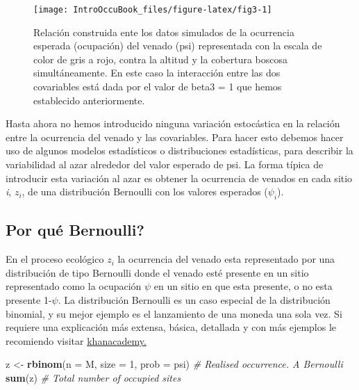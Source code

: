 \documentclass[
]{book}
\newenvironment{Shaded}{\begin{snugshade}}{\end{snugshade}}
\newcommand{\CommentTok}[1]{\textcolor[rgb]{0.56,0.35,0.01}{\textit{#1}}}
\newcommand{\DataTypeTok}[1]{\textcolor[rgb]{0.13,0.29,0.53}{#1}}
\newcommand{\DecValTok}[1]{\textcolor[rgb]{0.00,0.00,0.81}{#1}}
\newcommand{\KeywordTok}[1]{\textcolor[rgb]{0.13,0.29,0.53}{\textbf{#1}}}
\newcommand{\NormalTok}[1]{#1}
\newcommand{\StringTok}[1]{\textcolor[rgb]{0.31,0.60,0.02}{#1}}
\begin{document}
\begin{figure}
\texttt{[image: IntroOccuBook\_files/figure-latex/fig3-1]} \caption[fig3]{Relación construida ente los datos simulados de la ocurrencia esperada (ocupación) del venado (psi) representada con la escala de color de gris a rojo, contra la altitud y la cobertura boscosa simultáneamente. En este caso la interacción entre las dos covariables está dada por el valor de beta3 = 1 que hemos establecido anteriormente.}\label{fig:fig3}
\end{figure}

Hasta ahora no hemos introducido ninguna variación estocástica en la relación entre la ocurrencia del venado y las covariables. Para hacer esto debemos hacer uso de algunos modelos estadísticos o distribuciones estadísticas, para describir la variabilidad al azar alrededor del valor esperado de psi. La forma típica de introducir esta variación al azar es obtener la ocurrencia de venados en cada sitio \emph{i}, \(z _{i}\), de una distribución Bernoulli con los valores esperados (\(\psi _{i}\)).

\hypertarget{por-quuxe9-bernoulli}{%
\subsection{Por qué Bernoulli?}\label{por-quuxe9-bernoulli}}

En el proceso ecológico \(z _{i}\) la ocurrencia del venado esta representado por una distribución de tipo Bernoulli donde el venado esté presente en un sitio representado como la ocupación \(\psi\) en un sitio en que esta presente, o no esta presente 1-\(\psi\). La distribución Bernoulli es un caso especial de la distribución binomial, y su mejor ejemplo es el lanzamiento de una moneda una sola vez. Si requiere una explicación más extensa, básica, detallada y con más ejemplos le recomiendo visitar \href{https://es.khanacademy.org/math/probability/statistics-inferential/margin-of-error/v/mean-and-variance-of-bernoulli-distribution-example}{khanacademy.}

\begin{Shaded}
\begin{Highlighting}[]
\NormalTok{z <-}\StringTok{ }\KeywordTok{rbinom}\NormalTok{(}\DataTypeTok{n =}\NormalTok{ M, }\DataTypeTok{size =} \DecValTok{1}\NormalTok{, }\DataTypeTok{prob =}\NormalTok{ psi)  }\CommentTok{# Realised occurrence. A Bernoulli}
\KeywordTok{sum}\NormalTok{(z)                                    }\CommentTok{# Total number of occupied sites}
\end{Highlighting}
\end{Shaded}
\end{document}
